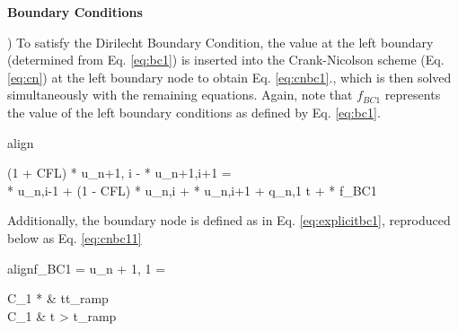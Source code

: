 \documentclass[10pt, letter, showtrims]{extarticle}
\newcommand{\boxedeq}[2]{\begin{empheq}[box={\fboxsep=6pt\fbox}]{align}\label{#1}#2\end{empheq}}
\begin{document}
		\pagebreak
		
		\noindent
		\textbf{Boundary Conditions}
		
		) To satisfy the Dirilecht Boundary Condition, the value at the left boundary (determined from Eq. \ref{eq:bc1}) is inserted into the Crank-Nicolson scheme (Eq. \ref{eq:cn}) at the left boundary node to obtain Eq. \ref{eq:cnbc1}., which is then solved simultaneously with the remaining equations. Again, note that $f_{BC1}$ represents the value of the left boundary conditions as defined by Eq. \ref{eq:bc1}.
		
%		
%
		
		\boxedeq{eq:cnbc1}{\begin{split}(1 + CFL) * u_{n+1, i} -  * u_{n+1,i+1} = \\ \frac{CFL}{2} * u_{n,i-1} + (1 - CFL) * u_{n,i} + \frac{CFL}{2} * u_{n,i+1} + q_{n,1} \Delta t + \frac{CFL}{2} * f_{BC1}\end{split}}    		
    		
    		\noindent
		Additionally, the boundary node is defined as in Eq. \ref{eq:explicitbc1}, reproduced below as Eq. \ref{eq:cnbc11}
		
		\boxedeq{eq:cnbc11}{f_{BC1} = u_{n + 1, 1} = \begin{cases} 
          			C_{1} * \frac{t}{t_{ramp}} & t\leq t_{ramp} \\
          			C_{1}                      & t > t_{ramp}
       			\end{cases}}
       			
\end{document}
